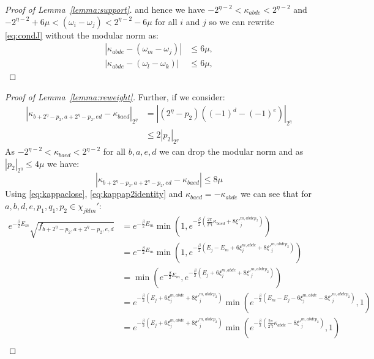 \documentclass[aps,floatfix,10pt,amssymb,amsfont,amsmath,superscriptaddress,float,nofootinbib,longbibliography,nobalancelastpage,twocolumn]{revtex4-2}
\begin{document}
\begin{proof}[Proof of Lemma~\ref{lemma:support}]
and hence we have $-2^{\eta-2}<\kappa_{abde} < 2^{\eta-2}$ and $-2^{\eta-2}+6\mu < (\omega_{i}-\omega_{j}) < 2^{\eta-2}-6\mu$ for all $i$ and $j$ so we can rewrite \eqref{eq:condJ} without the modular norm as:
\begin{equation}
    \begin{aligned}
    \left|\kappa_{abde}-(\omega_{m}-\omega_{j})\right|&\leq 6\mu,\\
    \left|\kappa_{abde}-(\omega_{l}-\omega_{k})\right|&\leq 6\mu,
\end{aligned}
\label{eq:kappaclose}
\end{equation}
\end{proof}
\begin{proof}[Proof of Lemma~\ref{lemma:reweight}]
Further, if we consider:
\begin{align}
    \left|\kappa_{b+2^{\eta}-p_2,a+2^{\eta}-p_2,ed} - \kappa_{baed}\right|_{2^{\eta}} &= |(2^{\eta}-p_2)((-1)^d-(-1)^e)|_{2^{\eta}}\\
    &\leq 2|p_2|_{2^\eta}
\end{align}
As $-2^{\eta-2}<\kappa_{baed} < 2^{\eta-2}$ for all $b,a,e,d$ we can drop the modular norm and as $|p_2|_{2^\eta} \leq 4\mu$ we have:
\begin{equation}
    \left|\kappa_{b+2^{\eta}-p_2,a+2^{\eta}-p_2,ed} - \kappa_{baed}\right| \leq 8\mu
    \label{eq:kappap2identity}
\end{equation}
Using \eqref{eq:kappaclose}, \eqref{eq:kappap2identity} and $\kappa_{baed}
= -\kappa_{abde}$ we can see that for $a,b,d,e,p_1,q_1,p_2 \in \chi_{jklm}'$:
\begin{equation}
    \begin{aligned}
    e^{-\frac{\beta}{2}E_m}\sqrt{f_{b+2^{\eta}-p_2,a+2^{\eta}-p_2,e,d}} &= e^{-\frac{\beta}{2}E_m}\min(1,e^{-\frac{\beta}{2}(\frac{2\pi}{2^{\eta}t}\kappa_{baed}+ 8\xi'^{m,abdep_2}_j)})\\
    &= e^{-\frac{\beta}{2}E_m}\min(1,e^{-\frac{\beta}{2}(E_j-E_m + 6\xi^{m,abde}_j+ 8\xi'^{m,abdep_2}_j)})\\
    &= \min\!\left(e^{-\frac{\beta}{2}E_m}, e^{-\frac{\beta}{2}(E_j + 6\xi^{m,abde}_j+ 8\xi'^{m,abdep_2}_j)}\right)\\
    &= e^{-\frac{\beta}{2}(E_j+ 6\xi^{m,abde}_j+ 8\xi'^{m,abdep_2}_j)} \min(e^{-\frac{\beta}{2}(E_m-E_j-6\xi^{m,abde}_j- 8\xi'^{m,abdep_2}_j)},1)\\
     &= e^{-\frac{\beta}{2}(E_j+ 6\xi^{m,abde}_j+ 8\xi'^{m,abdep_2}_j)} \min(e^{-\frac{\beta}{2}(\frac{2\pi}{2^{\eta}t}\kappa_{abde}- 8\xi'^{m,abdep_2}_j)},1)\\

\end{aligned}
\end{equation}
\end{proof}
\end{document}
